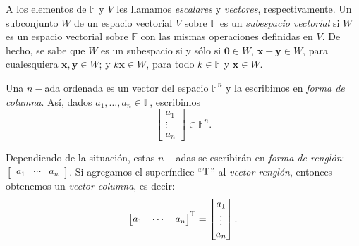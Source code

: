             A los elementos de $\mathbb{F}$ y $V$ les llamamos \textit{escalares} y \textit{vectores}, respectivamente. Un subconjunto $W$ de un espacio vectorial $V$ sobre $\mathbb{F}$ es un \textit{subespacio vectorial} si $W$ es un espacio vectorial sobre $\mathbb{F}$ con las mismas operaciones definidas en $V$. De hecho, se sabe que $W$ es un subespacio si  y sólo si $\mathbf{0} \in W$, $\mathbf{x + y} \in W$, para cualesquiera $\mathbf{x,y} \in W$; y $k\mathbf{x} \in W$, para todo $k \in \mathbb{F}$ y $\mathbf{x} \in W$. 
            
            Una $n-$ada ordenada es un vector del espacio $\mathbb{F}^{n}$ y la escribimos en \textit{forma de columna}. Así, dados $a_{1}, \ldots, a_{n} \in \mathbb{F}$, escribimos 
                $$
                \begin{bmatrix}
                    a_{1} \\
                    \vdots \\
                    a_{n}
                \end{bmatrix} \in \mathbb{F}^{n}.
                $$

            Dependiendo de la situación, estas $n-$adas se escribirán en \textit{forma de renglón}:$\begin{bmatrix}
                    a_{1} & \cdots & a_{n}
                \end{bmatrix}$. Si agregamos el superíndice ``$\textnormal{T}$'' al \textit{vector renglón}, entonces obtenemos un \textit{vector columna}, es decir:
                $$
                \begin{bmatrix}
                    a_{1} & \cdots & a_{n}
                \end{bmatrix} ^{\textnormal{T}} = \begin{bmatrix}
                    a_{1} \\
                    \vdots \\
                    a_{n}
                \end{bmatrix}. 
                $$

